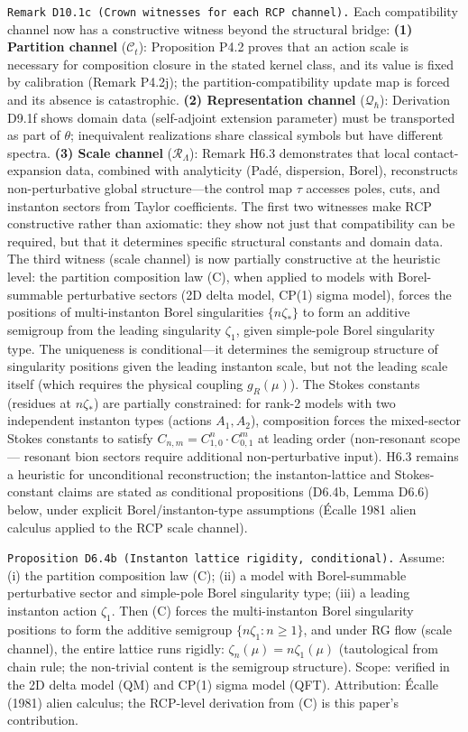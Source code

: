 \documentclass[
]{article}
\begin{document}
\texttt{Remark\ D10.1c\ (Crown\ witnesses\ for\ each\ RCP\ channel).}
Each compatibility channel now has a constructive witness beyond the
structural bridge: \textbf{(1) Partition channel} (\(\mathcal C_t\)):
Proposition P4.2 proves that an action scale is necessary for
composition closure in the stated kernel class, and its value is fixed
by calibration (Remark P4.2j); the partition-compatibility update map is
forced and its absence is catastrophic. \textbf{(2) Representation
channel} (\(\mathcal Q_\hbar\)): Derivation D9.1f shows domain data
(self-adjoint extension parameter) must be transported as part of
\(\theta\); inequivalent realizations share classical symbols but have
different spectra. \textbf{(3) Scale channel} (\(\mathcal R_\Lambda\)):
Remark H6.3 demonstrates that local contact-expansion data, combined
with analyticity (Padé, dispersion, Borel), reconstructs
non-perturbative global structure---the control map \(\tau\) accesses
poles, cuts, and instanton sectors from Taylor coefficients. The first
two witnesses make RCP constructive rather than axiomatic: they show not
just that compatibility can be required, but that it determines specific
structural constants and domain data. The third witness (scale channel)
is now partially constructive at the heuristic level: the partition
composition law (C), when applied to models with Borel-summable
perturbative sectors (2D delta model, CP(1) sigma model), forces the
positions of multi-instanton Borel singularities \(\{n\zeta_*\}\) to
form an additive semigroup from the leading singularity \(\zeta_1\),
given simple-pole Borel singularity type. The uniqueness is
conditional---it determines the semigroup structure of singularity
positions given the leading instanton scale, but not the leading scale
itself (which requires the physical coupling \(g_R(\mu)\)). The Stokes
constants (residues at \(n\zeta_*\)) are partially constrained: for
rank-2 models with two independent instanton types (actions
\(A_1, A_2\)), composition forces the mixed-sector Stokes constants to
satisfy \(C_{n,m} = C_{1,0}^n \cdot C_{0,1}^m\) at leading order
(non-resonant scope --- resonant bion sectors require additional
non-perturbative input). H6.3 remains a heuristic for unconditional
reconstruction; the instanton-lattice and Stokes-constant claims are
stated as conditional propositions (D6.4b, Lemma D6.6) below, under
explicit Borel/instanton-type assumptions (Écalle 1981 alien calculus
applied to the RCP scale channel).

\texttt{Proposition\ D6.4b\ (Instanton\ lattice\ rigidity,\ conditional).}
Assume: (i) the partition composition law (C); (ii) a model with
Borel-summable perturbative sector and simple-pole Borel singularity
type; (iii) a leading instanton action \(\zeta_1\). Then (C) forces the
multi-instanton Borel singularity positions to form the additive
semigroup \(\{n\zeta_1 : n\ge 1\}\), and under RG flow (scale channel),
the entire lattice runs rigidly: \(\zeta_n(\mu) = n\zeta_1(\mu)\)
(tautological from chain rule; the non-trivial content is the semigroup
structure). Scope: verified in the 2D delta model (QM) and CP(1) sigma
model (QFT). Attribution: Écalle (1981) alien calculus; the RCP-level
derivation from (C) is this paper's contribution.
\end{document}
